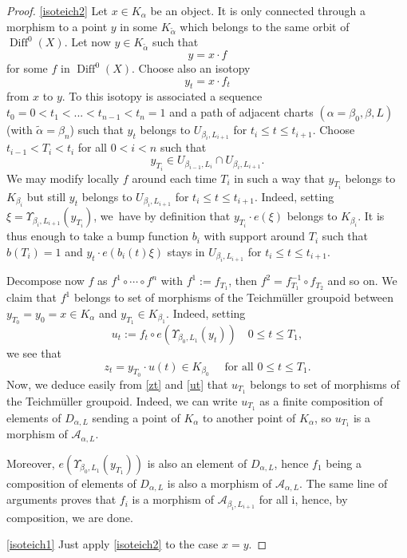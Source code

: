 \documentclass[10pt]{amsart}
\let\mathcal\mathscr
\DeclareMathOperator{\Diff}{Diff}
\theoremstyle{plain}
\theoremstyle{definition}
\theoremstyle{remark}
\numberwithin{equation}{section}
\providecommand{\skpt}{\par\smallskip\noindent}
\begin{document}
\skpt
\begin{proof}
\eqref{isoteich2} Let $x\in K_{\alpha}$ be an object. It is only connected through a morphism to a point $y$ in some $K_{\tilde\alpha}$ which belongs to the same orbit of $\Diff^0(X)$.
Let now $y\in K_{\tilde\alpha}$ such that
\begin{equation}
\label{itii}
y=x\cdot f
\end{equation}
for some $f$ in $\Diff^0(X)$. Choose also an isotopy
\begin{equation}
\label{itisotopy}
y_t=x\cdot f_t
\end{equation}
from $x$ to $y$. To this isotopy is associated a sequence $t_0=0<t_1<...<t_{n-1}<t_n=1$ and a path of adjacent charts $(\alpha=\beta_0,\beta,L)$ (with $\tilde\alpha=\beta_n$) such that $y_t$ belongs to $U_{\beta_i,L_{i+1}}$ for $t_i\leq t\leq t_{i+1}$. Choose $t_{i-1}<T_i<t_{i}$ for all $0<i<n$ such that
\begin{equation}
y_{T_i}\in U_{\beta_{i-1},L_{i}}\cap U_{\beta_{i},L_{i+1}}.
\end{equation}
We may modify locally $f$ around each time $T_i$ in such a way that $y_{T_i}$ belongs to $K_{\beta_i}$ but still $y_t$ belongs to $U_{\beta_i,L_{i+1}}$ for $t_i\leq t\leq t_{i+1}$. Indeed, setting $\xi=\Upsilon_{\beta_i,L_{i+1}}(y_{T_i})$, we~have by definition that $y_{T_i}\cdot e(\xi)$ belongs to $K_{\beta_i}$.
It is thus enough to take a bump function $b_i$ with support around $T_i$ such that $b(T_i)=1$ and $y_t\cdot e(b_i(t)\xi)$ stays in $U_{\beta_i,L_{i+1}}$ for $t_i\leq t\leq t_{i+1}$.

Decompose now $f$ as $f^1\circ\cdots\circ f^n$ with $f^1:=f_{T_1}$, then $f^2=f_{T_1}^{-1}\circ f_{T_2}$ and so on. We claim that $f^1$ belongs to set of morphisms of the Teichmüller groupoid between $y_{T_0}=y_0=x\in K_\alpha$ and $y_{T_1}\in K_{\beta_1}$. Indeed, setting
\begin{equation}
\label{ut}
u_t:=f_t\circ e(\Upsilon_{\beta_0,L_1}(y_t))
\quad 0\leq t\leq T_1,
\end{equation}
we see that
\begin{equation}
\label{zt}
z_{t}=y_{T_0}\cdot u(t)\in K_{\beta_0}
\quad \text{ for all }0\leq t\leq T_1.
\end{equation}
Now, we deduce easily from \eqref{zt} and \eqref{ut} that $u_{T_1}$ belongs to set of morphisms of the Teichmüller groupoid. Indeed, we can write $u_{T_1}$ as a finite composition of elements of $D_{\alpha,L}$ sending a point of $K_\alpha$ to another point of $K_\alpha$, so $u_{T_1}$ is a morphism of $\mathcal A_{\alpha,L}$.

Moreover, $e(\Upsilon_{\beta_0,L_1}(y_{T_1}))$ is also an element of $D_{\alpha,L}$, hence $f_1$ being a composition of elements of $D_{\alpha,L}$ is also a morphism of $\mathcal A_{\alpha,L}$.
The same line of arguments proves that $f_i$ is a morphism of $\mathcal A_{\beta_i,L_{i+1}}$ for all i, hence, by composition, we are done.

\eqref{isoteich1} Just apply \eqref{isoteich2} to the case $x=y$.
\end{proof}
\end{document}
